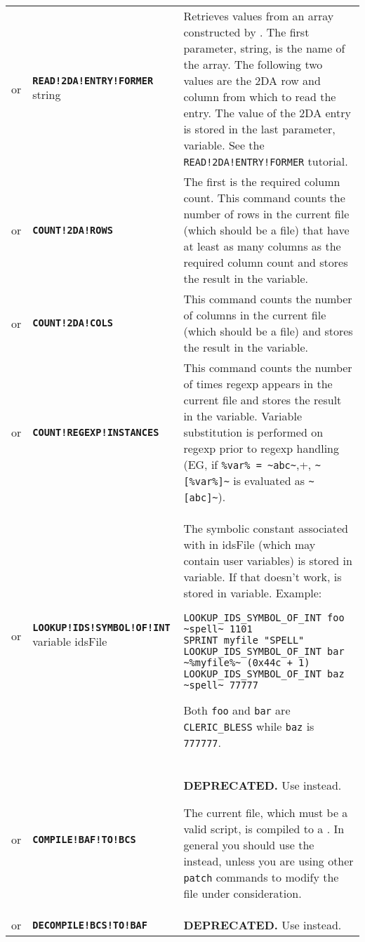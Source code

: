 \documentclass{article}
\def\ttref#1{\ahrefloc{#1}{\tt #1}}
\def\DEFINE#1{{\tt \bf #1}\label{#1}\index{#1}}
\def\t#1{{\tt #1}}
\begin{document}
\begin{tabular}{cp{10in}|p{10in}}
  or & \DEFINE{READ!2DA!ENTRY!FORMER} string \ttref{value} \ttref{value}
  \ttref{variable} &

  Retrieves values from an array constructed by
  \ttref{READ!2DA!ENTRIES!NOW}. The first parameter, string, is the
  name of the array. The following two values are the 2DA row and
  column from which to read the entry. The value of the 2DA entry is
  stored in the last parameter, variable. See the
  \t{READ!2DA!ENTRY!FORMER} tutorial. \\

or & \DEFINE{COUNT!2DA!ROWS} \ttref{value} \ttref{variable} &
  The first \ttref{value} is the required column count. This command
  counts the number of rows in the current file (which should be a
  \ttref{2DA} file) that have at least as many columns as the required
  column count and stores the result in the variable. \\
or & \DEFINE{COUNT!2DA!COLS} \ttref{variable} &
  This command counts the number of columns in the current file (which should be a
  \ttref{2DA} file) and stores the result in the variable. \\
or & \DEFINE{COUNT!REGEXP!INSTANCES} \ttref{optcase} \ttref{optexact} \ttref{regexp}
    \ttref{variable} &
  This command counts the number of times regexp appears in the current file
  and stores the result in the variable. Variable substitution is performed
  on regexp prior to regexp handling (EG, if \verb+%var% = ~abc~+,
  \verb+~[%var%]~+ is evaluated as \verb+~[abc]~+). \\

or & \DEFINE{LOOKUP!IDS!SYMBOL!OF!INT} variable idsFile \ttref{value} &
  The symbolic constant associated with \ttref{value} in idsFile (which may
  contain user variables) is stored
  in variable. If that doesn't work, \ttref{value} is stored in variable.
  Example:
\begin{verbatim}
LOOKUP_IDS_SYMBOL_OF_INT foo ~spell~ 1101
SPRINT myfile "SPELL"
LOOKUP_IDS_SYMBOL_OF_INT bar ~%myfile%~ (0x44c + 1)
LOOKUP_IDS_SYMBOL_OF_INT baz ~spell~ 77777
\end{verbatim}
  Both \t{foo} and \t{bar} are \t{CLERIC\_BLESS} while \t{baz} is
  \t{777777}. \\

or & \DEFINE{COMPILE!BAF!TO!BCS} &
\textbf{DEPRECATED.} Use \ttref{DECOMPILE!AND!PATCH} instead.

  The current file, which must be a valid \ttref{BAF} script, is compiled
  to a \ttref{BCS}. In general you should use the \ttref{COMPILE}
  \ttref{TP2 Action} instead, unless you are using other \t{patch} commands
  to modify the file under consideration. \\
or & \DEFINE{DECOMPILE!BCS!TO!BAF} &
\textbf{DEPRECATED.} Use \ttref{DECOMPILE!AND!PATCH} instead.


\end{tabular}
\end{document}
